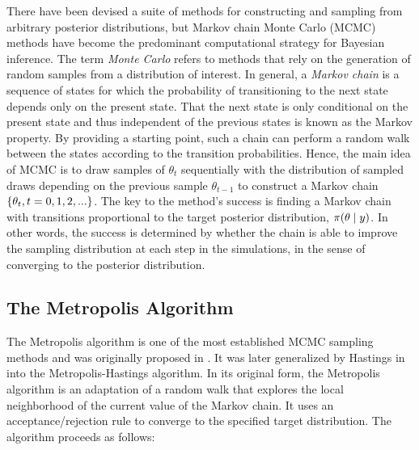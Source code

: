 There have been devised a suite of methods for constructing and sampling from arbitrary posterior distributions, but Markov chain Monte Carlo (MCMC) methods have become the predominant computational strategy for Bayesian inference. The term \textit{Monte Carlo} refers to methods that rely on the generation of random samples from a distribution of interest. In general, a \textit{Markov chain} is a sequence of states for which the probability of transitioning to the next state depends only on the present state. That the next state is only conditional on the present state and thus independent of the previous states is known as the Markov property. By providing a starting point, such a chain can perform a random walk between the states according to the transition probabilities. Hence, the main idea of MCMC is to draw samples of $\theta_t$ sequentially with the distribution of sampled draws depending on the previous sample $\theta_{t-1}$ to construct a Markov chain $\qty{\theta_t, t=0,1,2,...}$. The key to the method's success is finding a Markov chain with transitions proportional to the target posterior distribution, $\pi \qty(\theta \mid y)$. In other words, the success is determined by whether the chain is able to improve the sampling distribution at each step in the simulations, in the sense of converging to the posterior distribution. 


\subsection{The Metropolis Algorithm}

The Metropolis algorithm is one of the most established MCMC sampling methods and was originally proposed in \cite{Metropolis}. It was later generalized by Hastings in \cite{Hastings} into the Metropolis-Hastings algorithm. In its original form, the Metropolis algorithm is an adaptation of a random walk that explores the local neighborhood of the current value of the Markov chain. It uses an acceptance/rejection rule to converge to the specified target distribution. The algorithm proceeds as follows:

